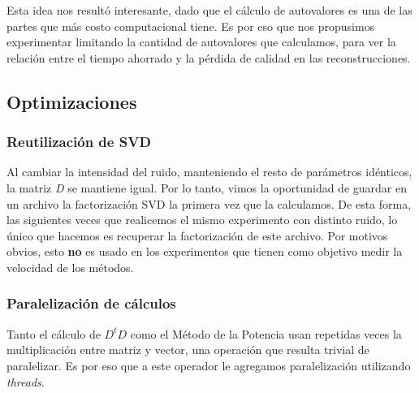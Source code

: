 Esta idea nos resultó interesante,
dado que el cálculo de autovalores es una de las partes que más costo computacional tiene.
Es por eso que nos propusimos experimentar limitando la cantidad de autovalores que calculamos,
para ver la relación entre el tiempo ahorrado y la pérdida de calidad en las reconstrucciones.

\subsection{Optimizaciones}
\label{sec:desarrollo-opt}
\subsubsection{Reutilización de SVD}
Al cambiar la intensidad del ruido, manteniendo el resto de parámetros idénticos,
la matriz \textit{D} se mantiene igual.
Por lo tanto, vimos la oportunidad de guardar en un archivo la factorización SVD la primera vez que la calculamos.
De esta forma, las siguientes veces que realicemos el mismo experimento con distinto ruido,
lo único que hacemos es recuperar la factorización de este archivo.
Por motivos obvios, esto \textbf{no} es usado en los experimentos
que tienen como objetivo medir la velocidad de los métodos.

\subsubsection{Paralelización de cálculos}
Tanto el cálculo de $D^{t} D$ como el Método de la Potencia
usan repetidas veces la multiplicación entre matriz y vector,
una operación que resulta trivial de paralelizar.
Es por eso que a este operador le agregamos paralelización utilizando \textit{threads}.
